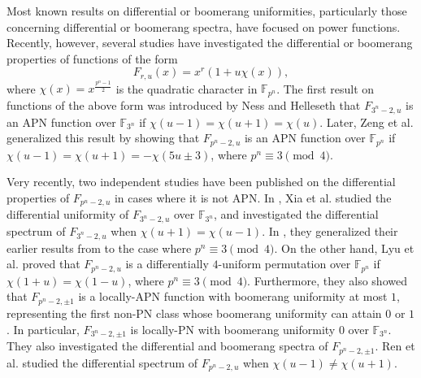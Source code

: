 \documentclass[11pt]{article}
\numberwithin{theorem}{section}
\newcommand{\F}{\mathbb F}
\newcommand{\Fpn}{\mathbb{F}_{p^n}}
\begin{document}
Most known results on differential or boomerang uniformities, particularly those concerning differential or boomerang spectra, have focused on power functions. Recently, however, several studies have investigated the differential or boomerang properties of functions of the form
\begin{equation*}
	F_{r,u}(x)=x^r (1+u\chi(x)),
\end{equation*}
where $\chi(x) = x^{\frac{p^n - 1}2}$ is the quadratic character in $\Fpn$.
The first result on functions of the above form was introduced by Ness and Helleseth \cite{NH07} that $F_{3^n-2, u}$ is an APN function over $\F_{3^n}$ if $\chi(u-1)=\chi(u+1)=\chi(u)$. Later, Zeng et al. \cite{ZHYJ07} generalized this result by showing that $F_{p^n-2, u}$ is an APN function over $\Fpn$ if $\chi(u-1)=\chi(u+1)=-\chi(5u\pm 3)$, where $p^n\equiv 3\pmod{4}$.

Very recently, two independent studies have been published on the differential properties of $F_{p^n-2, u}$ in cases where it is not APN. In \cite{XBC+24}, Xia et al. studied the differential uniformity of $F_{3^n-2,u}$ over $\F_{3^n}$, and investigated the differential spectrum of $F_{3^n-2,u}$ when $\chi(u+1)=\chi(u-1)$. In \cite{XLB+24}, they generalized their earlier results from \cite{XBC+24} to the case where $p^n\equiv 3\pmod{4}$. On the other hand, Lyu et al. \cite{LWZ24} proved that $F_{p^n-2,u}$ is a differentially $4$-uniform permutation over $\Fpn$ if $\chi(1+u)=\chi(1-u)$, where $p^n \equiv 3 \pmod{4}$. Furthermore, they also showed that $F_{p^n-2,\pm1}$ is a locally-APN function with boomerang uniformity at most $1$, representing the first non-PN class whose boomerang uniformity can attain $0$ or $1$. In particular, $F_{3^n-2, \pm1}$ is locally-PN with boomerang uniformity $0$ over $\F_{3^n}$. They also investigated the differential and boomerang spectra of $F_{p^n-2, \pm1}$. Ren et al. \cite{RXY24} studied the differential spectrum of $F_{p^n-2,u}$ when $\chi(u-1)\ne \chi(u+1)$.
\end{document}
